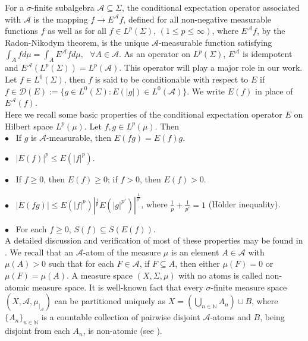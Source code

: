 \documentclass{amsart}
\theoremstyle{definition}\newtheorem{defn}[thm]{Definition}
\theoremstyle{remark}
\numberwithin{equation}{section}
\begin{document}
\vspace*{0.3cm} For a $\sigma$-finite subalgebra
$\mathcal{A}\subseteq\Sigma$, the conditional expectation operator
associated with $\mathcal{A}$ is the mapping $f\rightarrow
E^{\mathcal{A}}f$, defined for all non-negative measurable
functions $f$ as well as for all $f\in L^p(\Sigma)$, $(1\leq p\leq \infty)$, where
$E^{\mathcal{A}}f$, by the Radon-Nikodym theorem, is the unique
$\mathcal{A}$-measurable function satisfying
$\int_{A}fd\mu=\int_{A}E^{\mathcal{A}}fd\mu, \ \ \ \forall A\in
\mathcal{A}$. As an operator on $L^{p}({\Sigma})$,
$E^{\mathcal{A}}$ is idempotent and
$E^{\mathcal{A}}(L^p(\Sigma))=L^p(\mathcal{A})$. This operator
will play a major role in our work. Let $f\in L^0(\Sigma)$, then
$f$ is said to be conditionable with respect to $E$ if
$f\in\mathcal{D}(E):=\{g\in L^0(\Sigma): E(|g|)\in
L^0(\mathcal{A})\}$. We
write $E(f)$ in place of $E^{\mathcal{A}}(f)$.\\
Here we recall some basic properties of the conditional expectation operator $E$ on Hilbert space $L^p(\mu)$. Let $f,g\in L^p(\mu)$. Then\\
\vspace*{0.2cm} \noindent $\bullet$ \  If $g$ is
$\mathcal{A}$-measurable, then $E(fg)=E(f)g$.

\noindent $\bullet$ \ $|E(f)|^p\leq E(|f|^p)$.

\noindent $\bullet$ \ If $f\geq 0$, then $E(f)\geq 0$; if $f>0$,
then $E(f)>0$.

\noindent $\bullet$ \ $|E(fg)|\leq
E(|f|^p)|^{\frac{1}{p}}E(|g|^{p'})|^{\frac{1}{p'}}$, where
$\frac{1}{p}+\frac{1}{p'}=1$ (H\"{o}lder inequality).

\noindent $\bullet$ \ For each $f\geq 0$, $S(f)\subseteq
S(E(f))$. \\

 A detailed discussion and verification of
most of these properties may be found in \cite{rao}. We recall that
an $\mathcal{A}$-atom of the measure $\mu$ is an element
$A\in\mathcal{A}$ with $\mu(A)>0$ such that for each
$F\in\mathcal{A}$, if $F\subseteq A$, then either $\mu(F)=0$ or
$\mu(F)=\mu(A)$. A measure space $(X,\Sigma,\mu)$ with no atoms is
called non-atomic measure space. It is well-known fact that every
$\sigma$-finite measure space $(X,
\mathcal{A},\mu_{\mid_{\mathcal{A}}})$ can be partitioned uniquely
as $X=\left (\bigcup_{n\in\mathbb{N}}A_n\right )\cup B$, where
$\{A_n\}_{n\in\mathbb{N}}$ is a countable collection of pairwise
disjoint $\mathcal{A}$-atoms and $B$, being disjoint from each
$A_n$, is non-atomic (see \cite{z}).
\end{document}
